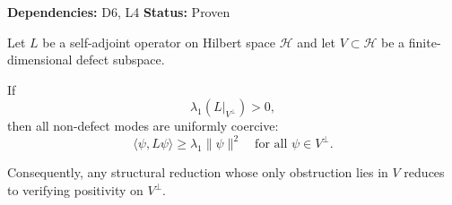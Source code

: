 \begin{theorem}
\textbf{Dependencies: } D6, L4
\textbf{Status: } Proven

Let $L$ be a self-adjoint operator on Hilbert space $\mathcal H$ and let $V \subset \mathcal H$ be a finite-dimensional defect subspace.

If
\[
\lambda_1(L|_{V^\perp}) > 0,
\]
then all non-defect modes are uniformly coercive:
\[
\langle \psi, L \psi \rangle \ge \lambda_1 \|\psi\|^2
\quad \text{for all } \psi \in V^\perp.
\]

Consequently, any structural reduction whose only obstruction lies in $V$ reduces to verifying positivity on $V^\perp$.
\end{theorem}
